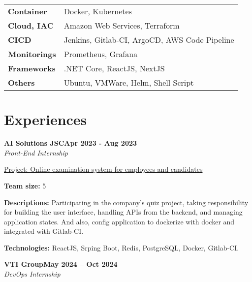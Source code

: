 \documentclass[letterpaper,10pt]{article}
\newcommand{\heading}[2]{
  \hspace{10pt}#1\hfill#2\\
}
\newcommand{\headingBf}[2]{
  \heading{\textbf{#1}}{\textbf{#2}}
}
\newcommand{\headingIt}[2]{
  \heading{\textit{#1}}{\textit{#2}}
}
\newenvironment{resume_list}{
  \vspace{-7pt}
  \begin{itemize}[itemsep=-2px, parsep=1pt, leftmargin=30pt]
}{
  \end{itemize}
}
\newcommand{\itemTitle}[1]{
  \item[] \underline{#1}\vspace{4pt}
}
\begin{document}
\begin{tabularx}{\textwidth}{@{} l X @{}}
\textbf{Container} & \hspace{10pt} Docker, Kubernetes \\[8pt] %
\textbf{Cloud, IAC} & \hspace{10pt} Amazon Web Services, Terraform \\[8pt] %
\textbf{CICD} & \hspace{10pt} Jenkins, Gitlab-CI, ArgoCD, AWS Code Pipeline \\[8pt] %
\textbf{Monitorings} & \hspace{10pt} Prometheus, Grafana \\[8pt] %
\textbf{Frameworks} & \hspace{10pt} .NET Core, ReactJS, NextJS \\[8pt] %
\textbf{Others} & \hspace{10pt} Ubuntu, VMWare, Helm, Shell Script \\
\end{tabularx}




\section{Experiences}

\headingBf{AI Solutions JSC}{Apr 2023 - Aug 2023}
\headingIt{Front-End Internship}{}

\begin{resume_list}
    \itemTitle{Project: Online examination system for employees and candidates}
    \item \textbf{Team size:} 5
    \item \textbf{Descriptions:} Participating in the company's quiz project, taking responsibility for building the user interface, handling APIs from the backend, and managing application states. And also, config application to dockerize with docker and integrated with Gitlab-CI.
    \item \textbf{Technologies:} ReactJS, Srping Boot, Redis, PostgreSQL, Docker, Gitlab-CI.
\end{resume_list}



\headingBf{VTI Group}{May 2024 -- Oct 2024}
\headingIt{DevOps Internship}{}
\end{document}
